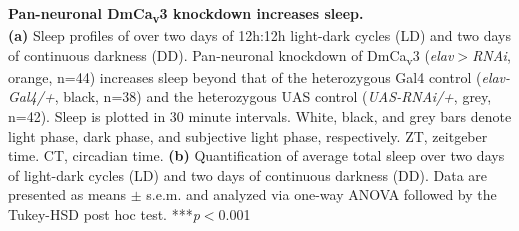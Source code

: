\label{fig:5}
\textbf{Pan-neuronal DmCa\textsubscript{v}3 knockdown increases sleep.}
\\
\textbf{(a)} Sleep profiles of over two days of 12h:12h light-dark cycles (LD) and two days of continuous darkness (DD). Pan-neuronal knockdown of DmCa\textsubscript{v}3 (\emph{elav$>$RNAi}, orange, n=44) increases sleep beyond that of the heterozygous Gal4 control (\emph{elav-Gal4/+}, black, n=38) and the heterozygous UAS control (\emph{UAS-RNAi/+}, grey, n=42).
Sleep is plotted in 30 minute intervals.
White, black, and grey bars denote light phase, dark phase, and subjective light phase, respectively.
ZT, zeitgeber time.
CT, circadian time.
\textbf{(b)} Quantification of average total sleep over two days of light-dark cycles (LD) and two days of continuous darkness (DD).
Data are presented as means $\pm$ s.e.m. and analyzed via one-way ANOVA followed by the Tukey-HSD post hoc test.
***\emph{p}$<$0.001
